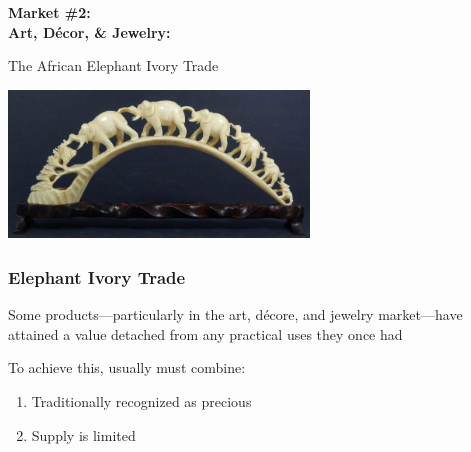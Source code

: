 \documentclass[10pt]{beamer}
\begin{document}
\begin{frame}
	\begin{center}
		\Large{\textbf{\textcolor{myblue}{Market \#2:\\ Art, D\'{e}cor, \& Jewelry:}}}\normalsize{}\\ 
		
		\vspace{0.25cm}
		
		The African Elephant Ivory Trade\\
		
		\vspace{1.0cm}
		
		\includegraphics[width=0.6\textwidth]{figures/ivory.png}
		
	\end{center}
\end{frame}


\begin{frame}[t]
\frametitle{Elephant Ivory Trade}
\vspace{0.5cm}

	Some products---particularly in the art, d\'{e}core, and jewelry market---have attained a value detached from any practical uses they once had
	
	\vspace{0.5cm}
	
	To achieve this, usually must combine:\\
		\medskip
		\begin{enumerate}
			\item Traditionally recognized as precious
			\medskip
			\item Supply is limited
		\end{enumerate}
\end{frame}
\end{document}
